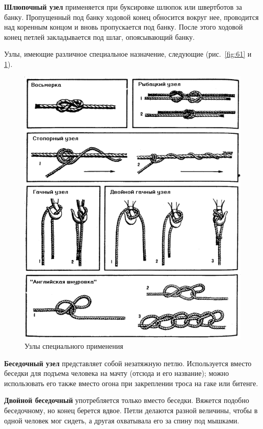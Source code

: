 \documentclass[a4paper, 12pt, twoside, final]{scrbook}
\begin{document}
\textbf{Шлюпочный узел} применяется при буксировке шлюпок или швертботов за банку. Пропущенный под банку ходовой конец обносится вокруг нее, проводится над коренным концом и вновь пропускается под банку. После этого ходовой конец петлей закладывается под шлаг, опоясывающий банку.

Узлы, имеющие различное специальное назначение, следующие (рис.~\ref{fig:61} и \ref{fig:62}).

\begin{figure}[htbp]
   \centering
   \includegraphics{pics/62_Uzly} %
   \caption{Узлы специального применения}
   \label{fig:62}
\end{figure}

\textbf{Беседочный узел} представляет собой незатяжную петлю. Используется вместо беседки для подъема человека на мачту (отсюда и его название); можно использовать его также вместо огона при закреплении троса на гаке или битенге.

\textbf{Двойной беседочный} употребляется только вместо беседки. Вяжется подобно беседочному, но конец берется вдвое. Петли делаются разной величины, чтобы в одной человек мог сидеть, а другая охватывала его за спину под мышками.
\end{document}
